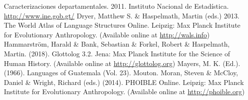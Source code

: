 \documentclass[12pt]{article}
\begin{document}
\begin{thebibliography}{}
Caracterizaciones departamentales. 2011. Instituto Nacional de Estadística. \href{http://www.ine.gob.gt/}{http://www.ine.gob.gt/}
Dryer, Matthew S. \& Haspelmath, Martin (eds.) 2013. The World Atlas of Language Structures Online. Leipzig: Max Planck Institute for Evolutionary Anthropology. (Available online at \href{http://wals.info}{http://wals.info})
Hammarström, Harald \& Bank, Sebastian \& Forkel, Robert \& Haspelmath, Martin. (2018). Glottolog 3.2. Jena: Max Planck Institute for the Science of Human History.  (Available online at \href{http://glottolog.org}{http://glottolog.org})
Mayers, M. K. (Ed.). (1966). Languages of Guatemala (Vol. 23). Mouton.
Moran, Steven \& McCloy, Daniel \& Wright, Richard (eds.) (2014). PHOIBLE Online. Leipzig: Max Planck Institute for Evolutionary Anthropology. (Available online at \href{http://phoible.org}{http://phoible.org})


\end{thebibliography}
\end{document}
